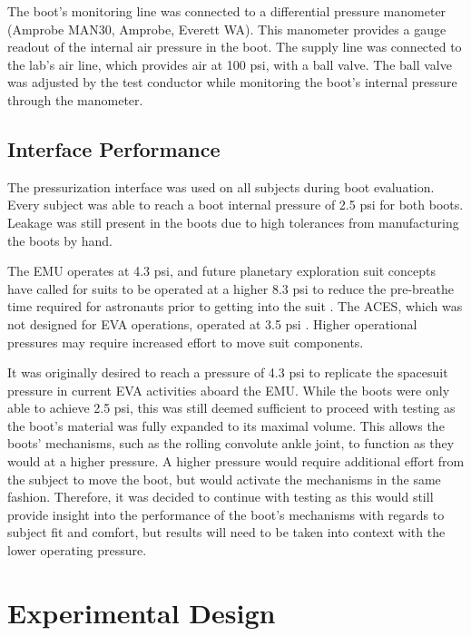 \documentclass[defaultstyle,11pt]{comps}
\begin{document}
The boot's monitoring line was connected to a differential pressure manometer (Amprobe MAN30, Amprobe, Everett WA).
This manometer provides a gauge readout of the internal air pressure in the boot.
The supply line was connected to the lab's air line, which provides air at 100 psi, with a ball valve.
The ball valve was adjusted by the test conductor while monitoring the boot's internal pressure through the manometer.

\hypertarget{interface-performance}{%
\subsection{Interface Performance}\label{interface-performance}}

The pressurization interface was used on all subjects during boot evaluation.
Every subject was able to reach a boot internal pressure of 2.5 psi for both boots.
Leakage was still present in the boots due to high tolerances from manufacturing the boots by hand.

The EMU operates at 4.3 psi, and future planetary exploration suit concepts have called for suits to be operated at a higher 8.3 psi to reduce the pre-breathe time required for astronauts prior to getting into the suit \citep{Kosmo1988}.
The ACES, which was not designed for EVA operations, operated at 3.5 psi \citep{Thomas2012}.
Higher operational pressures may require increased effort to move suit components.

It was originally desired to reach a pressure of 4.3 psi to replicate the spacesuit pressure in current EVA activities aboard the EMU.
While the boots were only able to achieve 2.5 psi, this was still deemed sufficient to proceed with testing as the boot's material was fully expanded to its maximal volume.
This allows the boots' mechanisms, such as the rolling convolute ankle joint, to function as they would at a higher pressure.
A higher pressure would require additional effort from the subject to move the boot, but would activate the mechanisms in the same fashion.
Therefore, it was decided to continue with testing as this would still provide insight into the performance of the boot's mechanisms with regards to subject fit and comfort, but results will need to be taken into context with the lower operating pressure.

\hypertarget{experimental-design}{%
\section{Experimental Design}\label{experimental-design}}
\end{document}
